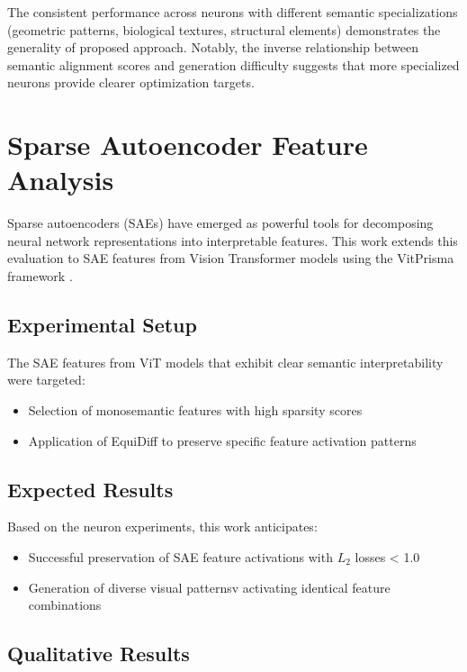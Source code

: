 \documentclass[licencjacka,en]{pracamgr}
\newcommand{\method}[1]{EquiDiff}  %
\begin{document}
The consistent performance across neurons with different semantic specializations (geometric patterns, biological textures, structural elements) demonstrates the generality of proposed approach. Notably, the inverse relationship between semantic alignment scores and generation difficulty suggests that more specialized neurons provide clearer optimization targets.

\section{Sparse Autoencoder Feature Analysis}

Sparse autoencoders (SAEs) have emerged as powerful tools for decomposing neural network representations into interpretable features. This work extends this evaluation to SAE features from Vision Transformer models using the VitPrisma framework \citep{joseph2025prismaopensourcetoolkit}.

\subsection{Experimental Setup}

The SAE features from ViT models that exhibit clear semantic interpretability were targeted:
\begin{itemize}
\item Selection of monosemantic features with high sparsity scores
\item Application of \method{} to preserve specific feature activation patterns
\end{itemize}

\subsection{Expected Results}

Based on the neuron experiments, this work anticipates:
\begin{itemize}
\item Successful preservation of SAE feature activations with $L_2$ losses < 1.0
\item Generation of diverse visual patternsv activating identical feature combinations
\end{itemize}

\subsection{Qualitative Results}
\end{document}
